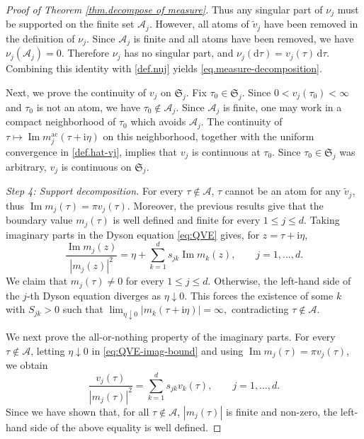\documentclass[11pt,twoside, a4paper]{article}
\numberwithin{equation}{section}
\numberwithin{figure}{section}
\theoremstyle{plain} %
\theoremstyle{definition}
\theoremstyle{remark}
\newcommand{\1} {\mspace{1 mu}}
\newcommand{\2} {\mspace{2 mu}}
\newcommand{\dd}{\mathrm{d}}
\DeclareMathOperator{\im}{Im}
\begin{document}
\begin{proof}[Proof of Theorem \ref{thm.decompose of measure}]
Thus any singular part of \(\nu_j\) must be supported on the finite set \(\mathcal{A}_j\). 
However, all atoms of \(\tilde{v}_j\) have been removed in the definition of \(\nu_j\). 
Since \(\mathcal{A}_j\) is finite and all atoms have been removed, we have
$
\nu_j(\mathcal{A}_j)=0.
$
Therefore \(\nu_j\) has no singular part, and $\nu_j(\dd\tau)  = v_j(\tau)\,\dd\tau$.
Combining this identity with \eqref{def.nuj} yields \eqref{eq.measure-decomposition}.

Next, we prove the continuity of \(v_j\) on \(\mathfrak S_j\). 
Fix \(\tau_0\in\mathfrak S_j\). Since \(0<v_j(\tau_0)<\infty\) and 
\(\tau_0\) is not an atom, we have \(\tau_0\notin\mathcal{A}_j\). 
Since $\mathcal A_j$ is finite, one may work in a compact neighborhood of $\tau_0$ which avoids $\mathcal A_j$. 
The continuity of $\tau\mapsto \im m_j^{\mathrm{ac}}(\tau+\mathrm i\eta)$ on this neighborhood, together with the uniform convergence in \eqref{def.hat-vj}, implies that $v_j$ is continuous at $\tau_0$.
Since \(\tau_0\in\mathfrak S_j\) was arbitrary, \(v_j\) is continuous on \(\mathfrak S_j\).

\medskip


  


\textit{Step 4: Support decomposition.}
For every $\tau\notin\mathcal{A}$, $\tau$ cannot be an atom for any $\tilde{v}_j$, thus $\im m_j(\tau)=\pi v_j(\tau)$. 
Moreover, the previous results give that the boundary value $m_j(\tau)$ is well defined and finite for every $1\le j\le d$. 
Taking imaginary parts in the Dyson equation \eqref{eq:QVE} gives, for \(z=\tau+\mathrm i\eta\),
\begin{equation}\label{eq:QVE-imag-bound}
  \frac{\im m_j(z)}{|m_j(z)|^2}
  =
  \eta+\sum_{k=1}^d s_{jk}\im m_k(z),\qquad j=1,\dots,d.
\end{equation}
We claim that $m_j(\tau)\neq 0$ for every $1\le j\le d$. Otherwise, the left-hand side of the
\(j\)-th Dyson equation diverges as \(\eta\downarrow0\). This forces the existence
of some \(k\) with \(S_{jk}>0\) such that
$
   \lim_{\eta\downarrow 0}|m_k(\tau+\mathrm i\eta)|=\infty ,
$
contradicting \(\tau\notin\mathcal A\).


We next prove the all-or-nothing property of the imaginary parts. 
For every \(\tau\notin\mathcal A\), letting \(\eta\downarrow0\) in \eqref{eq:QVE-imag-bound} and using
\(\im m_j(\tau)=\pi v_j(\tau)\), we obtain
\begin{equation}\label{eq:boundary-imag-equation}
  \frac{v_j(\tau)}{|m_j(\tau)|^2}
  =
  \sum_{k=1}^d s_{jk}v_k(\tau),\qquad j=1,\dots,d.
\end{equation}
Since we have shown that, for all $\tau\notin \mathcal{A}$, \(|m_j(\tau)|\) is finite and non-zero, 
the left-hand side of the above equality is well defined.




\end{proof}
\end{document}
